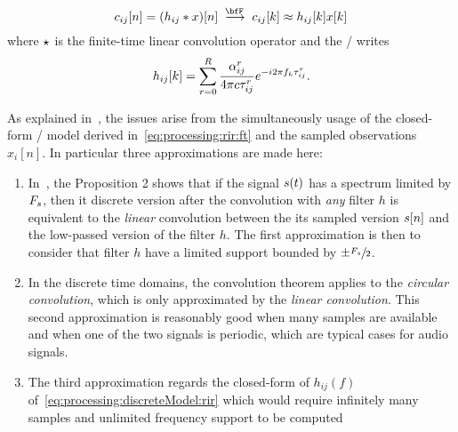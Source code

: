 \begin{equation}
    c_{ij}[n] = (h_{ij} \conv x)[n]
    \;\overset{\discreteFT{}}{\kto}\;
    c_{ij}[k] \approx h_{ij}[k] x[k]
\end{equation}
where $\star$ is the finite-time linear convolution operator and the \RIR/ writes
    \begin{equation}\label{eq:processing:discreteModel:rir}
        h_{ij}[ k] = \sum_{r=0}^{R}
                    \frac{\alpha_{ij}^r}{4 \pi c \tau_{ij}^r}
                    {e}^{- {i} 2 \pi f_k \tau_{ij}^r}
        .
    \end{equation}

As explained in~, the issues arise from the simultaneously usage of the closed-form \RIR/ model derived in~\cref{eq:processing:rir:ft}
and the sampled observations $x_i[n]$. In particular three approximations are made here:

\begin{enumerate}
    \item\label{en:processing:dft:approx1}
    In~, the Proposition 2 shows that if the signal $s(t)$ has a spectrum limited by $F_s$, then it discrete version after the convolution with \textit{any} filter $h$
    is equivalent to the \textit{linear} convolution between the its sampled version $s[n]$ and the low-passed version of the filter $h$.
    The first approximation is then to consider that filter $h$ have a limited support bounded by $\pm \sfrac{F_s}{2}$.
    \item\label{en:processing:dft:approx2}
    In the discrete time domains, the convolution theorem applies to the \textit{circular convolution}, which is only approximated by the \textit{linear convolution}.
    This second approximation is reasonably good when many samples are available and when one of the two signals is periodic, which
    are typical cases for audio signals.
    \item\label{en:processing:dft:approx3}
    The third approximation regards the closed-form of $h_{ij}(f)$ of~\cref{eq:processing:discreteModel:rir} which
    would require infinitely many samples and unlimited frequency support to be computed
\end{enumerate}

